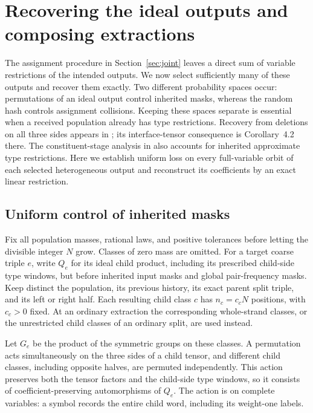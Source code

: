 \section{Recovering the ideal outputs and composing extractions}
\label{sec:recovery}

The assignment procedure in Section~\ref{sec:joint} leaves a direct sum
of variable restrictions of the intended outputs.  We now select
sufficiently many of these outputs and recover them exactly.  Two different probability spaces occur: permutations
of an ideal output control inherited masks, whereas the random hash
controls assignment collisions.  Keeping these spaces separate is
essential when a received population already has type restrictions.
Recovery from deletions on all three sides appears in
\cite[Section~7, especially Property~7.1 and Theorem~7.2]{VXXZ2023};
its interface-tensor consequence is Corollary~4.2 there.  The
constituent-stage analysis in \cite[Section~6.5]{MoreAsymmetry2026}
also accounts for inherited approximate type restrictions.  Here we
establish uniform loss on every full-variable orbit of each selected
heterogeneous output and reconstruct its coefficients by an exact linear
restriction.

\subsection{Uniform control of inherited masks}\label{sec:recovery-masks}

Fix all population masses, rational laws, and positive tolerances before
letting the divisible integer $N$ grow.  Classes of zero mass are omitted.
For a target coarse triple $e$, write $Q_e$ for its ideal child product,
including its prescribed child-side type windows, but before inherited
input masks and global pair-frequency masks.  Keep distinct the
population, its previous history, its exact parent split triple, and its
left or right half.  Each resulting child class $c$ has $n_c=c_cN$
positions, with $c_c>0$ fixed.  At an ordinary extraction the corresponding
whole-strand classes, or the unrestricted child classes of an ordinary
split, are used instead.

Let $G_e$ be the product of the symmetric groups on these classes.
A permutation acts simultaneously on the three sides of a child tensor,
and different child classes, including opposite halves, are permuted
independently.  This action preserves both the tensor factors and the
child-side type windows, so it consists of coefficient-preserving
automorphisms of $Q_e$.  The action is on complete variables: a symbol
records the entire child word, including its weight-one labels.

